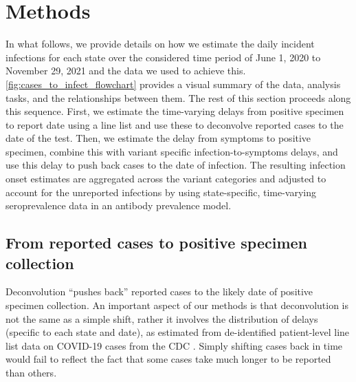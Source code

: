 \section{Methods}
\label{sec:methods}


In what follows, we provide details on how we estimate the daily incident
infections for each state over the considered time period of June 1, 2020 to
November 29, 2021 and the data we used to achieve this.
\autoref{fig:cases_to_infect_flowchart} provides a visual summary of the data,
analysis tasks, and the relationships between them. The rest of this section
proceeds along this sequence. First, we estimate the time-varying
delays from positive specimen to report date using a line list and use these
to deconvolve reported cases to the date of the test. Then, we estimate the 
delay from symptoms to positive specimen, combine this with variant specific
infection-to-symptoms delays, and use this delay to push back cases to the date
of infection. The resulting infection onset estimates are aggregated
across the variant categories and adjusted to account for the unreported
infections by using state-specific, time-varying seroprevalence data in an
antibody prevalence model. 

\subsection{From reported cases to positive specimen collection}
\label{sec:step1}

Deconvolution ``pushes back'' reported cases to the likely date of positive
specimen collection. An important aspect of our methods is that deconvolution is
not the same as a simple shift, rather it involves the distribution of delays
(specific to each state and date), as estimated from de-identified patient-level
line list data on COVID-19 cases from the CDC \citep{cdc2020caserestr}. Simply
shifting cases back in time would fail to reflect the fact that some cases take
much longer to be reported than others.

